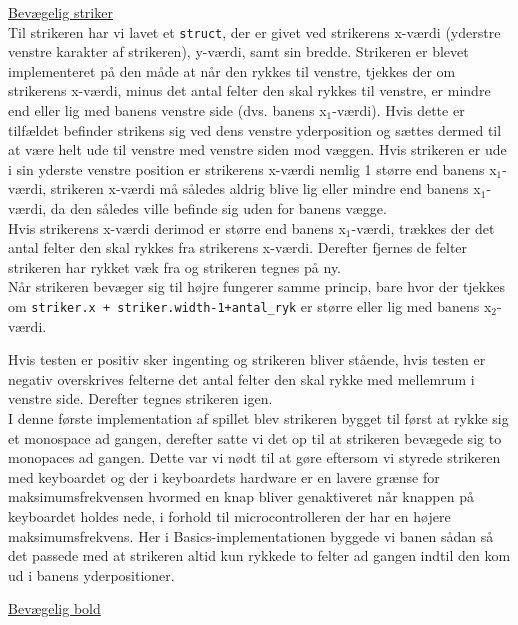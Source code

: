 \underline{Bevægelig striker}\\

Til strikeren har vi lavet et \texttt{struct}, der er givet ved strikerens x-værdi (yderstre venstre karakter af strikeren), y-værdi, samt sin bredde.
Strikeren er blevet implementeret på den måde at når den rykkes til venstre, tjekkes der om strikerens x-værdi, minus det antal felter den skal rykkes til venstre, er mindre end eller lig med banens venstre side (dvs. banens x$_{1}$-værdi). Hvis dette er tilfældet befinder strikens sig ved dens venstre yderposition og sættes dermed til at være helt ude til venstre med venstre siden mod væggen.
Hvis strikeren er ude i sin yderste venstre position er strikerens x-værdi nemlig 1 større end banens x$_{1}$-værdi, strikeren x-værdi må således aldrig blive lig eller mindre end banens x$_{1}$-værdi, da den således ville befinde sig uden for banens vægge. \\

Hvis strikerens x-værdi derimod er større end banens x$_{1}$-værdi, trækkes der det antal felter den skal rykkes fra strikerens x-værdi. Derefter fjernes de felter strikeren har rykket væk fra og strikeren tegnes på ny. \\

Når strikeren bevæger sig til højre fungerer samme princip, bare hvor der tjekkes om \texttt{striker.x + striker.width-1+antal\_ryk} er større eller lig med banens x$_{2}$-værdi. 

Hvis testen er positiv sker ingenting og strikeren bliver stående, hvis testen er negativ overskrives felterne det antal felter den skal rykke med mellemrum i venstre side. Derefter tegnes strikeren igen. \\

I denne første implementation af spillet blev strikeren bygget til først at rykke sig et monospace ad gangen, derefter satte vi det op til at strikeren bevægede sig to monopaces ad gangen. Dette var vi nødt til at gøre eftersom vi styrede strikeren med keyboardet og der i keyboardets hardware er en lavere grænse for maksimumsfrekvensen hvormed en knap bliver genaktiveret når knappen på keyboardet holdes nede, i forhold til microcontrolleren der har en højere maksimumsfrekvens. Her i Basics-implementationen byggede vi banen sådan så det passede med at strikeren altid kun rykkede to felter ad gangen indtil den kom ud i banens yderpositioner.\\
\newpage

\underline{Bevægelig bold}\\

